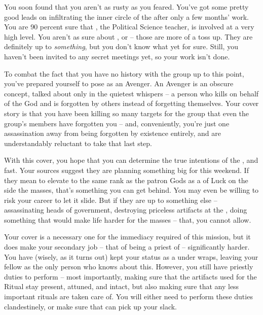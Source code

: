\documentclass[char]{GL2020}
\begin{document}
You soon found that you aren’t as rusty as you feared. You’ve got some pretty good leads on infiltrating the inner circle of the \pGoaties{} after only a few months' work. You are 90 percent sure that \cChupInventor{}, the Political Science teacher, is involved at a very high level. You aren’t as sure about \cChupSecond{}, or \cWildCard{} -- those are more of a toss up. They are definitely up to \emph{something}, but you don’t know what yet for sure. Still, you haven’t been invited to any secret meetings yet, so your work isn’t done. 

To combat the fact that you have no history with the group up to this point, you’ve prepared yourself to pose as an Avenger. An Avenger is an obscure concept, talked about only in the quietest whispers -- a person who kills on behalf of the God \cGenesis{} and is forgotten by others instead of forgetting themselves. Your cover story is that you have been killing so many targets for the group that even the group’s members have forgotten you -- and, conveniently, you’re just one assassination away from being forgotten by existence entirely, and are understandably reluctant to take that last step.

With this cover, you hope that you can determine the true intentions of the \pGoaties{}, and fast. Your sources suggest they are planning something big for this weekend. If they mean to elevate \cGenesis{} to the same rank as the patron Gods as a \cGenesis{\Deity} of Luck on the side the masses, that’s something you can get behind. You may even be willing to risk your career to let it slide. But if they are up to something else -- assassinating heads of government, destroying priceless artifacts at the \pSchool{}, doing something that would make life harder for the masses -- that, you cannot allow.

Your cover is a necessary one for the immediacy required of this mission, but it does make your secondary job -- that of being a priest of \cFarmGod{} -- significantly harder. You have (wisely, as it turns out) kept your status as a \cInterpol{\cleric} under wraps, leaving your fellow \pFarm{} \cHedonist{\cleric} \cHedonist{} as the only person who knows about this. However, you still have priestly duties to perform -- most importantly, making sure that the artifacts used for the Ritual stay present, attuned, and intact, but also making sure that any less important rituals are taken care of. You will either need to perform these duties clandestinely, or make sure that \cHedonist{} can pick up your slack.
\end{document}
